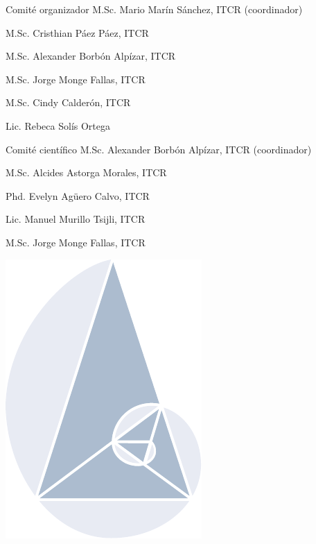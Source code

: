 \documentclass[svgnames,table, x11names, 11pt]{beamer}
\begin{document}
	\begin{frame}[fragile]{} 
		\begin{columns}[t]
			\begin{column}{0.33\textwidth}
			
			
				\begin{block}{Comité organizador}
M.Sc. Mario Marín Sánchez, ITCR (coordinador)

M.Sc. Cristhian Páez Páez, ITCR

M.Sc. Alexander Borbón Alpízar, ITCR

M.Sc. Jorge Monge Fallas, ITCR

M.Sc. Cindy Calderón, ITCR

Lic. Rebeca Solís Ortega
				\end{block}
				
				\begin{block}{Comité científico}
M.Sc. Alexander Borbón Alpízar, ITCR (coordinador)

M.Sc. Alcides Astorga Morales, ITCR

Phd. Evelyn Agüero Calvo, ITCR

Lic. Manuel Murillo Tsijli, ITCR

M.Sc. Jorge Monge Fallas, ITCR
				\end{block}
				\vspace{-10cm}
				\hspace*{-10cm}
				\includegraphics[scale=3.5, angle=30]{IconoCIEMACTransparente}

			\end{column}
			

\end{columns}
\end{frame}
\end{document}
